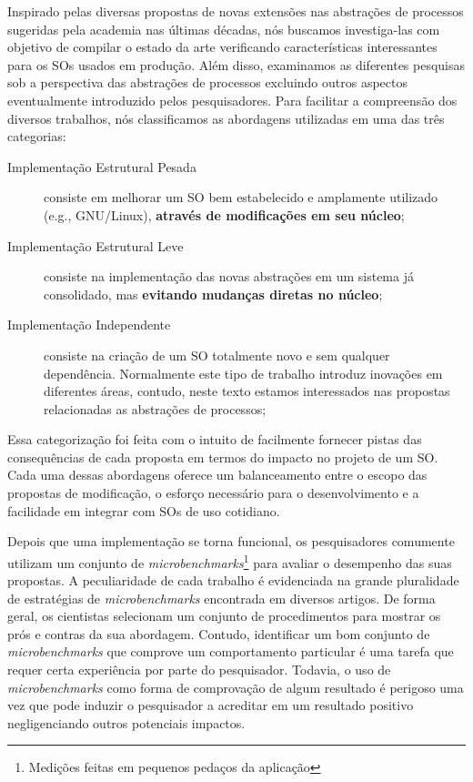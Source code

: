 Inspirado pelas diversas propostas de novas extensões nas abstrações de
processos sugeridas pela academia nas últimas décadas, nós buscamos
investiga-las com objetivo de compilar o estado da arte verificando
características interessantes para os SOs usados em produção. Além disso,
examinamos as diferentes pesquisas sob a perspectiva das abstrações de
processos excluindo outros aspectos eventualmente introduzido pelos
pesquisadores. Para facilitar a compreensão dos diversos trabalhos, nós
classificamos as abordagens utilizadas em uma das três categorias:

\begin{description}
\item [Implementação Estrutural Pesada]

consiste em melhorar um SO bem estabelecido e amplamente utilizado (e.g., GNU/Linux), \textbf{através de modificações em seu núcleo};

\item [Implementação Estrutural Leve]

consiste na implementação das novas abstrações em um sistema já consolidado,
mas \textbf{evitando mudanças diretas no núcleo};

\item [Implementação Independente]

consiste na criação de um SO totalmente novo e sem qualquer dependência.
Normalmente este tipo de trabalho introduz inovações em diferentes áreas,
contudo, neste texto estamos interessados nas propostas relacionadas as
abstrações de processos;

\end{description}

Essa categorização foi feita com o intuito de facilmente fornecer pistas das
consequências de cada proposta em termos do impacto no projeto de um SO. Cada
uma dessas abordagens oferece um balanceamento entre o escopo das propostas de
modificação, o esforço necessário para o desenvolvimento e a facilidade em
integrar com SOs de uso cotidiano.

Depois que uma implementação se torna funcional, os pesquisadores comumente
utilizam um conjunto de \emph{microbenchmarks}\footnote{Medições feitas em
pequenos pedaços da aplicação} para avaliar o desempenho das suas propostas. A
peculiaridade de cada trabalho é evidenciada na grande pluralidade de
estratégias de \emph{microbenchmarks} encontrada em diversos artigos.
De forma geral, os cientistas selecionam um conjunto de procedimentos para mostrar
os prós e contras da sua abordagem. Contudo, identificar um bom conjunto de
\emph{microbenchmarks} que comprove um comportamento particular é uma tarefa
que requer certa experiência por parte do pesquisador. Todavia, o uso de
\textit{microbenchmarks} como forma de comprovação de algum resultado é
perigoso uma vez que pode induzir o pesquisador a acreditar em um resultado
positivo negligenciando outros potenciais impactos.

